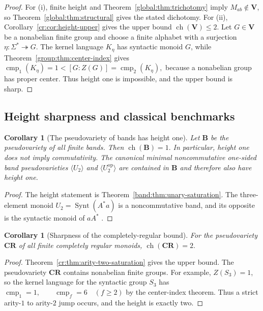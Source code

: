 \documentclass[10pt,a4paper]{article}
\newtheorem{corollary}[theorem]{Corollary}
\theoremstyle{definition}
\theoremstyle{remark}
\newcommand{\cmp}{\operatorname{cmp}}
\begin{document}
\begin{proof}
For \textup{(i)}, finite height and
Theorem~\ref{global:thm:trichotomy} imply \(M_{ab}\notin\mathbf V\), so
Theorem~\ref{global:thm:structural} gives the stated dichotomy.
For \textup{(ii)}, Corollary~\ref{cr:cor:height-upper} gives the upper bound
\(\operatorname{ch}(\mathbf V)\le2\).  Let \(G\in\mathbf V\) be a
nonabelian finite group and choose a finite alphabet with a surjection
\(\eta:\Sigma^*\twoheadrightarrow G\).  The kernel language \(K_\eta\)
has syntactic monoid \(G\), while
Theorem~\ref{group:thm:center-index} gives
\(
 \cmp_1(K_\eta)=1< [G:Z(G)]=\cmp_2(K_\eta),
\)
because a nonabelian group has proper center.  Thus height one is impossible,
and the upper bound is sharp.
\end{proof}


\subsection{Height sharpness and classical benchmarks}

\begin{corollary}[The pseudovariety of bands has height one]
\label{band:cor:height-one}
Let \(\mathbf B\) be the pseudovariety of all finite bands.  Then
\(\operatorname{ch}(\mathbf B)=1.\)
In particular, height one does not imply commutativity.  The canonical
minimal noncommutative one-sided band pseudovarieties
\(\langle U_2\rangle\) and \(\langle U_2^{\mathrm{op}}\rangle\) are
contained in \(\mathbf B\) and therefore also have height one.
\end{corollary}

\begin{proof}
The height statement is Theorem~\ref{band:thm:unary-saturation}.  The
three-element monoid \(U_2=\operatorname{Synt}(A^*a)\) is a noncommutative
band, and its opposite is the syntactic monoid of \(aA^*\)
\cite{MargolisPin1984}.
\end{proof}




\begin{corollary}[Sharpness of the completely-regular bound]
\label{cr:cor:height}
For the pseudovariety $\mathbf{CR}$ of all finite completely regular monoids,
\(
\operatorname{ch}(\mathbf{CR})=2.
\)
\end{corollary}

\begin{proof}
Theorem~\ref{cr:thm:arity-two-saturation} gives the upper bound. The
pseudovariety $\mathbf{CR}$ contains nonabelian finite groups.  For example,
$Z(S_3)=1$, so the kernel language for the syntactic group $S_3$ has
\(\cmp_1=1, \qquad \cmp_f=6\quad(f\ge2)\)
by the center-index theorem.  Thus a strict arity-$1$ to arity-$2$ jump occurs,
and the height is exactly two.
\end{proof}
\end{document}
